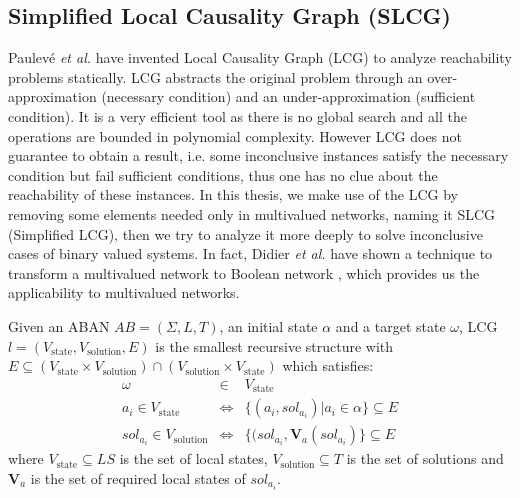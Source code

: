 \subsection{Simplified Local Causality Graph (SLCG)}\label{sec:SLCG}
Paulev\'e \textit{et al.} \cite{pauleve2011} have invented Local Causality Graph (LCG) to analyze reachability problems statically.
LCG abstracts the original problem through an over-approximation (necessary condition) and an under-approximation (sufficient condition).
It is a very efficient tool as there is no global search and all the operations are bounded in polynomial complexity.
However LCG does not guarantee to obtain a result, i.e. some inconclusive instances satisfy the necessary condition but fail sufficient conditions, thus one has no clue about the reachability of these instances.
In this thesis, we make use of the LCG by removing some elements needed only in multivalued networks, naming it SLCG (Simplified LCG), then we try to analyze it more deeply to solve inconclusive cases of binary valued systems.
In fact, Didier \textit{et al.} have shown a technique to transform a multivalued network to Boolean network \cite{didier2011mapping}, which provides us the applicability to multivalued networks.

\begin{definition}[SLCG]\label{defSLCG}
Given an ABAN $AB = (\Sigma,L,T)$, an initial state $\alpha$ and a target state $\omega$, LCG $l= (V_{\mathrm{state}},V_{\mathrm{solution}},E)$ is the smallest recursive structure with $E \subseteq (V_{\mathrm{state}}\times V_{\mathrm{solution}})\cap (V_{\mathrm{solution}}\times V_{\mathrm{state}})$ which satisfies:
\begin{eqnarray*}
    \omega&\in& V_{\mathrm{state}} \\
    a_i\in V_{\mathrm{state}} &\Leftrightarrow& \{ (a_i, sol_{a_i})| a_i\in \alpha\}\subseteq E \\
    sol_{a_i}\in V_{\mathrm{solution}}&\Leftrightarrow& \{ (sol_{a_i},\mathbf{V}_a (sol_{a_i})\}\subseteq E
\end{eqnarray*}
where $V_{\mathrm{state}}\subseteq LS$ is the set of local states, $V_{\mathrm{solution}}\subseteq T$ is the set of solutions and $\mathbf{V}_a$ is the set of required local states of $sol_{a_i}$.
\end{definition}

